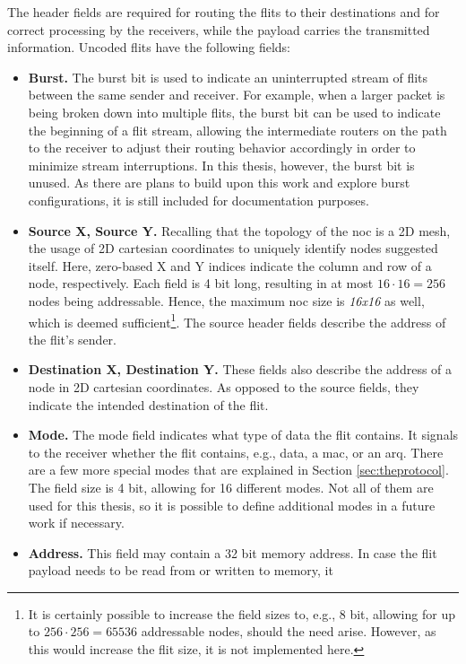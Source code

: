 The header fields are required for routing the flits to their destinations and for correct processing by the receivers, while the payload carries the
transmitted information. Uncoded flits have the following fields:
\begin{itemize}
    \item \textbf{Burst.} The burst bit is used to indicate an uninterrupted stream of flits between the same sender and receiver. For example, when a
        larger packet is being broken down into multiple flits, the burst bit can be used to indicate the beginning of a flit stream, allowing the
        intermediate routers on the path to the receiver to adjust their routing behavior accordingly in order to minimize stream interruptions. In
        this thesis, however, the burst bit is unused. As there are plans to build upon this work and explore burst configurations, it is still
        included for documentation purposes.
    \item \textbf{Source X, Source Y.} Recalling that the topology of the \gls{noc} is a 2D mesh, the usage of 2D cartesian coordinates to uniquely
        identify nodes suggested itself. Here, zero-based X and Y indices indicate the column and row of a node, respectively. Each field is 4 bit long,
        resulting in at most $16 \cdot 16 = 256$ nodes being addressable. Hence, the maximum \gls{noc} size is \textit{16x16} as well, which is deemed
        sufficient\footnote{It is certainly possible to increase the field sizes to, e.g., 8 bit, allowing for up to $256 \cdot 256 = 65536$ addressable
        nodes, should the need arise. However, as this would increase the flit size, it is not implemented here.}. The source header fields describe
        the address of the flit's sender.
    \item \textbf{Destination X, Destination Y.} These fields also describe the address of a node in 2D cartesian coordinates. As opposed to the
        source fields, they indicate the intended destination of the flit.
    \item \textbf{Mode.} The mode field indicates what type of data the flit contains. It signals to the receiver whether the flit contains, e.g.,
        data, a \gls{mac}, or an \gls{arq}. There are a few more special modes that are explained in Section \ref{sec:theprotocol}. The
        field size is 4 bit, allowing for 16 different modes. Not all of them are used for this thesis, so it is possible to define additional modes
        in a future work if necessary.
    \item \textbf{Address.} This field may contain a 32 bit memory address. In case the flit payload needs to be read from or written to memory, it

\end{itemize}
